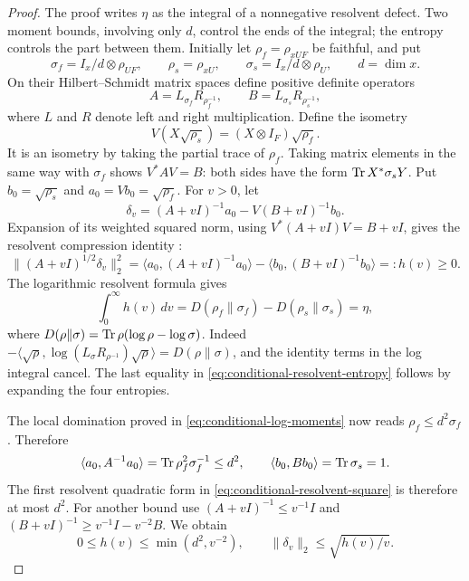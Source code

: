 \begin{proof}
The proof writes $\eta$ as the integral of a nonnegative resolvent
defect.  Two moment bounds, involving only $d$, control the ends of
the integral; the entropy controls the part between them.
Initially let
$\rho_f=\rho_{xUF}$ be faithful, and put
\[
 \sigma_f=I_x/d\otimes\rho_{UF},\qquad
 \rho_s=\rho_{xU},\qquad
 \sigma_s=I_x/d\otimes\rho_U,\qquad d=\dim x.
\]
On their Hilbert--Schmidt matrix spaces define positive definite
operators
\[
 A=L_{\sigma_f}R_{\rho_f^{-1}},\qquad
 B=L_{\sigma_s}R_{\rho_s^{-1}},
\]
where $L$ and $R$ denote left and right multiplication.  Define
the isometry
\[
 V(X\sqrt{\rho_s})=(X\otimes I_F)\sqrt{\rho_f}.
\]
It is an isometry by taking the partial trace of $\rho_f$.
Taking matrix elements in the same way with $\sigma_f$ shows
$V^*AV=B$: both sides have the form
$\operatorname{Tr} X^*\sigma_s Y$.  Put $b_0=\sqrt{\rho_s}$ and
$a_0=Vb_0=\sqrt{\rho_f}$.  For $v>0$, let
\[
 \delta_v=(A+vI)^{-1}a_0-V(B+vI)^{-1}b_0.
\]
Expansion of its weighted squared norm, using $V^*(A+vI)V=B+vI$,
gives the resolvent compression identity
\cite[Lemma~2.1]{CarlenVershynina2019}:
\begin{equation}\label{eq:conditional-resolvent-square}
 \|(A+vI)^{1/2}\delta_v\|_2^2
 =\langle a_0,(A+vI)^{-1}a_0\rangle
  -\langle b_0,(B+vI)^{-1}b_0\rangle
 =:h(v)\ge0.
\end{equation}
The logarithmic resolvent formula gives
\begin{equation}\label{eq:conditional-resolvent-entropy}
 \int_0^\infty h(v)\,dv
 =D(\rho_f\|\sigma_f)-D(\rho_s\|\sigma_s)=\eta,
\end{equation}
where $D(\rho\|\sigma)=\operatorname{Tr}\rho(\log\rho-\log\sigma)$.
Indeed $-\langle\sqrt\rho,\log(L_\sigma R_{\rho^{-1}})
\sqrt\rho\rangle=D(\rho\|\sigma)$, and the identity terms in
the log integral cancel.  The last equality in
\eqref{eq:conditional-resolvent-entropy} follows by expanding the
four entropies.

The local domination proved in
\eqref{eq:conditional-log-moments} now reads
$\rho_f\le d^2\sigma_f$.  Therefore
\[
 \langle a_0,A^{-1}a_0\rangle
   =\operatorname{Tr}\rho_f^2\sigma_f^{-1}\le d^2,
 \qquad
 \langle b_0,Bb_0\rangle=\operatorname{Tr}\sigma_s=1.
\]
The first resolvent quadratic form in
\eqref{eq:conditional-resolvent-square} is therefore at most $d^2$.
For another bound use $(A+vI)^{-1}\le v^{-1}I$ and
$(B+vI)^{-1}\ge v^{-1}I-v^{-2}B$.  We obtain
\begin{equation}\label{eq:conditional-resolvent-tail}
 0\le h(v)\le\min(d^2,v^{-2}),\qquad
 \|\delta_v\|_2\le\sqrt{h(v)/v}.
\end{equation}


\end{proof}

